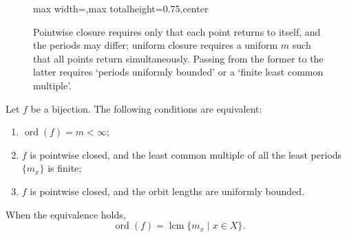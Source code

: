 \begin{figure}[htbp]
\centering
\begin{adjustbox}{max width=\linewidth,max totalheight=0.75\textheight,center}
\end{adjustbox}
\caption{Pointwise closure requires only that each point returns to itself, and the periods may differ; uniform closure requires a uniform $m$ such that all points return simultaneously. Passing from the former to the latter requires `periods uniformly bounded' or a `finite least common multiple'.}
\label{fig:pointwise_vs_uniform}
\end{figure}

\begin{theorem}\label{thm:finite_order_orbit}
Let $f$ be a bijection. The following conditions are equivalent:
\begin{enumerate}[label=(\roman*)]
    \item $\operatorname{ord}(f)=m<\infty$;
    \item $f$ is pointwise closed, and the least common multiple of all the least periods $\{m_x\}$ is finite;
    \item $f$ is pointwise closed, and the orbit lengths are uniformly bounded.
\end{enumerate}
When the equivalence holds,
\[
\operatorname{ord}(f)=\operatorname{lcm}\{m_x\mid x\in X\}.
\]
\end{theorem}

